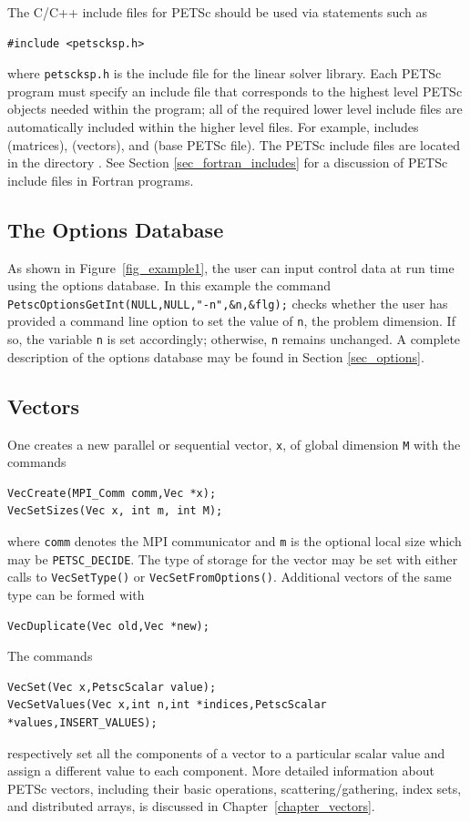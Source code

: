 The C/C++ include files for PETSc should be used via statements such as
\begin{lstlisting}
#include <petscksp.h>
\end{lstlisting}
where \lstinline{petscksp.h} is the include file for the linear solver library.
Each PETSc program must specify an
include file that corresponds to the highest level PETSc objects
needed within the program; all of the required lower level include
files are automatically included within the higher level files.  For
example,  includes  (matrices),
 (vectors), and  (base PETSc file).
The PETSc include files are located in the directory
.  See Section \ref{sec_fortran_includes}
for a discussion of PETSc include files in Fortran programs.

\subsection*{The Options Database}

As shown in Figure~\ref{fig_example1}, the user can input control data
at run time using the options database. In this example the command
\lstinline{PetscOptionsGetInt(NULL,NULL,"-n",&n,&flg);} checks whether the user has
provided a command line option to set the value of \lstinline{n}, the
problem dimension.  If so, the variable \lstinline{n} is set accordingly;
otherwise, \lstinline{n} remains unchanged. A complete description of the
options database may be found in Section \ref{sec_options}.

\subsection*{Vectors}
\label{sec_vecintro}

One creates a new parallel or
sequential vector, \lstinline{x}, of global dimension \lstinline{M} with the
commands  
\begin{lstlisting}
VecCreate(MPI_Comm comm,Vec *x);
VecSetSizes(Vec x, int m, int M);
\end{lstlisting}
where \lstinline{comm} denotes the MPI communicator and \lstinline{m} is the optional local size
which may be \lstinline{PETSC_DECIDE}. The type of storage
for the vector may be set with either calls to
\lstinline{VecSetType()} or \lstinline{VecSetFromOptions()}.
Additional vectors of the same type can be formed with
\begin{lstlisting}
VecDuplicate(Vec old,Vec *new);
\end{lstlisting}
The commands
\begin{lstlisting}
VecSet(Vec x,PetscScalar value);
VecSetValues(Vec x,int n,int *indices,PetscScalar *values,INSERT_VALUES);
\end{lstlisting}
respectively set all the components of a vector to a particular scalar
value and assign a different value to each component.  More
detailed information about PETSc vectors, including their basic
operations, scattering/gathering, index sets, and distributed arrays, is
discussed in Chapter~\ref{chapter_vectors}.

